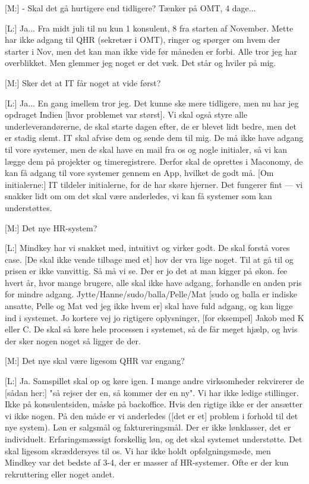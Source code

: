 [M:] - Skal det gå hurtigere end tidligere? Tænker på OMT, 4 dage...

[L:] Ja... Fra midt juli til nu kun 1 konsulent, 8 fra starten af November. Mette har ikke adgang til QHR (sekretær i OMT), ringer og spørger om hvem der starter i Nov, men det kan man ikke vide før måneden er forbi. Alle tror jeg har overblikket. Men glemmer jeg noget er det væk. Det står og hviler på mig.

[M:] Sker det at IT får noget at vide først?

[L:] Ja... En gang imellem tror jeg. Det kunne ske mere tidligere, men nu har jeg opdraget Indien [hvor problemet var størst]. Vi skal også styre alle underleverandørerne, de skal starte dagen efter, de er blevet lidt bedre, men det er stadig slemt. IT skal afvise dem og sende dem til mig. De må ikke have adgang til vore systemer, men de skal have en mail fra os og nogle initialer, så vi kan lægge dem på projekter og timeregistrere. Derfor skal de oprettes i Maconomy, de kan få adgang til vore systemer gennem en App, hvilket de godt må. [Om initialerne:] IT tildeler initialerne, for de har skøre hjerner. Det fungerer fint --- vi snakker lidt om om det skal være anderledes, vi kan få systemer som kan understøttes.

[M:] Det nye HR-system?

[L:] Mindkey har vi snakket med, intuitivt og virker godt. De skal forstå vores case. [De skal ikke vende tilbage med et] hov der vra lige noget. Til at gå til og prisen er ikke vanvittig. Så må vi se. Der er jo det at man kigger på økon. fee hvert år, hvor mange brugere, alle skal ikke have adgang, forhandle en anden pris for mindre adgang. Jytte/Hanne/sudo/balla/Pelle/Mat [sudo og balla er indiske ansatte, Pelle og Mat ved jeg ikke hvem er] skal have fuld adgang, og kan ligge ind i systemet. Jo kortere vej jo rigtigere oplysninger, [for eksempel] Jakob med K eller C. De skal så køre hele processen i systemet, så de får meget hjælp, og hvis der sker nogen noget så ligger de der.

[M:] Det nye skal være ligesom QHR var engang?

[L:] Ja. Samspillet skal op og køre igen. I mange andre virksomheder rekvirerer de [sådan her:] "så rejser der en, så kommer der en ny". Vi har ikke ledige stillinger. Ikke på konsulentsiden, måske på backoffice. Hvis den rigtige ikke er der ansætter vi ikke nogen. På den måde er vi anderledes ([det er et] problem i forhold til det nye system). Løn er salgsmål og faktureringsmål. Der er ikke lønklasser, det er individuelt. Erfaringsmæssigt forskellig løn, og det skal systemet understøtte. Det skal ligesom skræddersyes til os. Vi har ikke holdt opfølgningsmøde, men Mindkey var det bedste af 3-4, der er masser af HR-systemer. Ofte er der kun rekruttering eller noget andet.

